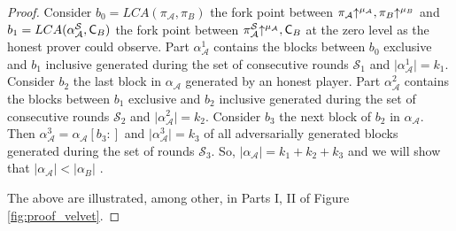 \begin{proof}
Consider $b_0 = LCA(\pi_\mathcal{A}, \pi_B)$ the fork point between $\pi_\mathcal{A} \negthickspace\uparrow^{\mu_\mathcal{A}}, \pi_B \negthickspace\uparrow^{\mu_B}$ and $b_1 = LCA (\alpha^{\mathcal{S}}_\mathcal{A}, \mathsf{C}_B)$ the fork point between $\pi^{\mathcal{S}}_\mathcal{A} \negthickspace\uparrow^{\mu_\mathcal{A}}, \mathsf{C}_B $ at the zero level as the honest prover could observe. Part
$\alpha_\mathcal{A}^1$ contains the blocks between $b_0$ exclusive and $b_1$ inclusive generated during the set of consecutive rounds $\mathcal{S}_1$ and $\lvert  \alpha_\mathcal{A}^1 \rvert = k_1$.
Consider $b_2$ the last block in $\alpha_\mathcal{A}$ generated by an honest player. Part $\alpha_{\mathcal{A}}^2$ contains the blocks between $b_1$ exclusive and $b_2$ inclusive generated during the set of consecutive rounds $\mathcal{S}_2$ and $\vert  \alpha_\mathcal{A}^2 \vert = k_2$. Consider $b_3$ the next block of $b_2$ in $\alpha_\mathcal{A}$. Then $\alpha_{\mathcal{A}}^3 = \alpha_\mathcal{A}[b_3{:}]$ and $\vert  \alpha_\mathcal{A}^3 \vert = k_3$ of all adversarially generated blocks generated during the set of rounds $\mathcal{S}_3$. So, $\vert \alpha_\mathcal{A} \vert = k_1 + k_2 + k_3$ and we will show that $\vert \alpha_\mathcal{A} \vert < \vert \alpha_B \vert$ .

The above are illustrated, among other, in Parts I, II of Figure \ref{fig:proof_velvet}.


\end{proof}
